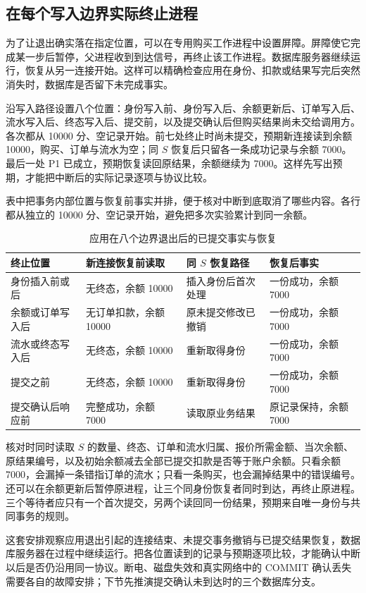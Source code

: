 \subsection*{在每个写入边界实际终止进程}

为了让退出确实落在指定位置，可以在专用购买工作进程中设置屏障。屏障使它完成某一步后暂停，父进程收到到达信号，再终止该工作进程。数据库服务器继续运行，恢复从另一连接开始。这样可以精确检查应用在身份、扣款或结果写完后突然消失时，数据库是否留下未完成事实。

沿写入路径设置八个位置：身份写入前、身份写入后、余额更新后、订单写入后、流水写入后、终态写入后、提交前，以及提交确认后但购买结果尚未交给调用方。各次都从 10000 分、空记录开始。前七处终止时尚未提交，预期新连接读到余额 10000，购买、订单与流水为空；同 \(S\) 恢复后只留各一条成功记录与余额 7000。最后一处 P1 已成立，预期恢复读回原结果，余额继续为 7000。这样先写出预期，才能把中断后的实际记录逐项与协议比较。



表中把事务内部位置与恢复前事实并排，便于核对中断到底取消了哪些内容。各行都从独立的 10000 分、空记录开始，避免把多次实验累计到同一余额。

\begin{table}[htbp]
\centering\small
\begin{tabularx}{\linewidth}{@{}p{3.0cm}XXX@{}}
\toprule
终止位置 & 新连接恢复前读取 & 同 \(S\) 恢复路径 & 恢复后事实\\
\midrule
身份插入前或后 & 无终态，余额 10000 & 插入身份后首次处理 & 一份成功，余额 7000\\
余额或订单写入后 & 无订单扣款，余额 10000 & 原未提交修改已撤销 & 一份成功，余额 7000\\
流水或终态写入后 & 无终态，余额 10000 & 重新取得身份 & 一份成功，余额 7000\\
提交之前 & 无终态，余额 10000 & 重新取得身份 & 一份成功，余额 7000\\
提交确认后响应前 & 完整成功，余额 7000 & 读取原业务结果 & 原记录保持，余额 7000\\
\bottomrule
\end{tabularx}
\caption{应用在八个边界退出后的已提交事实与恢复}
\end{table}

核对时同时读取 \(S\) 的数量、终态、订单和流水归属、报价所需金额、当次余额、原结果编号，以及初始余额减去全部已提交扣款是否等于账户余额。只看余额 7000，会漏掉一条错指订单的流水；只看一条购买，也会漏掉结果中的错误编号。还可以在余额更新后暂停原进程，让三个同身份恢复者同时到达，再终止原进程。三个等待者应只有一个首次提交，另两个读回同一份结果，预期来自唯一身份与共同事务的规则。

这套安排观察应用退出引起的连接结束、未提交事务撤销与已提交结果恢复，数据库服务器在过程中继续运行。把各位置读到的记录与预期逐项比较，才能确认中断以后是否仍沿用同一协议。断电、磁盘失效和真实网络中的 COMMIT 确认丢失需要各自的故障安排；下节先推演提交确认未到达时的三个数据库分支。
\FloatBarrier
